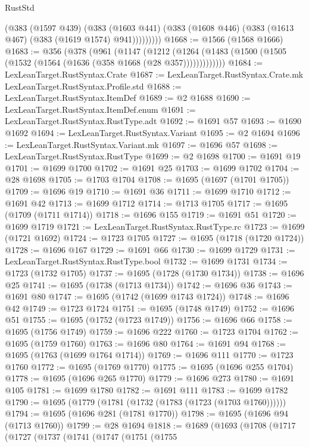 \begin{lexlean}{RustStd}
\begin{coremodule}
{\begin{coremodule}
{{{{{{{{{{{{{{{{            (@383
              (@1597 @439)
              (@383
                (@1603 @441)
                (@383 (@1608 @446) (@383 (@1613 @467) (@383 (@1619 @1574) @941)))))))))
@1668 := @1566 (@1568 @1666)
@1683 := @356
    (@378
      (@961
        (@1147
          (@1212 (@1264 (@1483 (@1500 (@1505 (@1532 (@1564 (@1636 (@358 @1668 (@28 @357)))))))))))))
@1684 := LexLeanTarget.RustSyntax.Crate
@1687 := LexLeanTarget.RustSyntax.Crate.mk LexLeanTarget.RustSyntax.Profile.std
@1688 := LexLeanTarget.RustSyntax.ItemDef
@1689 := @2 @1688
@1690 := LexLeanTarget.RustSyntax.ItemDef.enum
@1691 := LexLeanTarget.RustSyntax.RustType.adt
@1692 := @1691 @57
@1693 := @1690 @1692
@1694 := LexLeanTarget.RustSyntax.Variant
@1695 := @2 @1694
@1696 := LexLeanTarget.RustSyntax.Variant.mk
@1697 := @1696 @57
@1698 := LexLeanTarget.RustSyntax.RustType
@1699 := @2 @1698
@1700 := @1691 @19
@1701 := @1699 @1700
@1702 := @1691 @25
@1703 := @1699 @1702
@1704 := @28 @1698
@1705 := @1703 @1704
@1708 := @1695 (@1697 (@1701 @1705))
@1709 := @1696 @19
@1710 := @1691 @36
@1711 := @1699 @1710
@1712 := @1691 @42
@1713 := @1699 @1712
@1714 := @1713 @1705
@1717 := @1695 (@1709 (@1711 @1714))
@1718 := @1696 @155
@1719 := @1691 @51
@1720 := @1699 @1719
@1721 := LexLeanTarget.RustSyntax.RustType.rc
@1723 := @1699 (@1721 @1692)
@1724 := @1723 @1705
@1727 := @1695 (@1718 (@1720 @1724))
@1728 := @1696 @167
@1729 := @1691 @66
@1730 := @1699 @1729
@1731 := LexLeanTarget.RustSyntax.RustType.bool
@1732 := @1699 @1731
@1734 := @1723 (@1732 @1705)
@1737 := @1695 (@1728 (@1730 @1734))
@1738 := @1696 @25
@1741 := @1695 (@1738 (@1713 @1734))
@1742 := @1696 @36
@1743 := @1691 @80
@1747 := @1695 (@1742 (@1699 @1743 @1724))
@1748 := @1696 @42
@1749 := @1723 @1724
@1751 := @1695 (@1748 @1749)
@1752 := @1696 @51
@1755 := @1695 (@1752 (@1723 @1749))
@1756 := @1696 @66
@1758 := @1695 (@1756 @1749)
@1759 := @1696 @222
@1760 := @1723 @1704
@1762 := @1695 (@1759 @1760)
@1763 := @1696 @80
@1764 := @1691 @94
@1768 := @1695 (@1763 (@1699 @1764 @1714))
@1769 := @1696 @111
@1770 := @1723 @1760
@1772 := @1695 (@1769 @1770)
@1775 := @1695 (@1696 @255 @1704)
@1778 := @1695 (@1696 @265 @1770)
@1779 := @1696 @273
@1780 := @1691 @105
@1781 := @1699 @1780
@1782 := @1691 @111
@1783 := @1699 @1782
@1790 := @1695 (@1779 (@1781 (@1732 (@1783 (@1723 (@1703 @1760))))))
@1794 := @1695 (@1696 @281 (@1781 @1770))
@1798 := @1695 (@1696 @94 (@1713 @1760))
@1799 := @28 @1694
@1818 := @1689
    (@1693
      (@1708
        (@1717
          (@1727
            (@1737
              (@1741
                (@1747
                  (@1751
                    (@1755
}}}}}}}}}}}}}}}}
\end{coremodule}}
\end{coremodule}
\end{lexlean}
